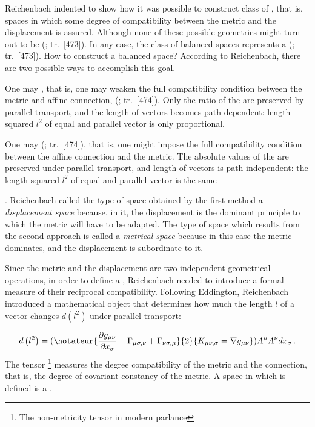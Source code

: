 \documentclass[submitted]{article}
\renewcommand{\rzlap}[2]{(\cite[#1]{Reichenbach1928}; tr.\ [#2])\xspace}
\begin{document}
Reichenbach indented to show how it was possible to construct class of , that is, spaces in which some degree of compatibility between the metric and the displacement is assured. Although none of these possible geometries might turn out to be  \rzlap{339}{473}. In any case, the class of balanced spaces represents a  \rzlap{339}{473}. How to construct a balanced space? According to Reichenbach, there are two possible ways to accomplish this goal. \begin{inparaenum}[(1)] \item One may , that is, one may weaken the full compatibility condition between the metric and affine connection,  \rzlap{339}{474}. Only the ratio of the \gmn are preserved by parallel transport, and the length of vectors becomes path-dependent: length-squared $l^2$ of equal and parallel vector is only proportional. \item One may  \rzlap{339}{474}, that is, one might impose the full compatibility condition between the affine connection and the metric. The absolute values of the \gmn are preserved under parallel transport, and length of vectors is path-independent: the length-squared $l^2$ of equal and parallel vector is the same \end{inparaenum}. Reichenbach called the type of space obtained by the first method a \emph{displacement space} because, in it, the displacement is the dominant principle to which the metric will have to be adapted. The type of space which results from the second approach is called a \emph{metrical space} because in this case the metric dominates, and the displacement is subordinate to it.

Since the metric and the displacement are two independent geometrical operations, in order to define a , Reichenbach needed to introduce a formal measure of their reciprocal compatibility. Following Eddington, Reichenbach introduced a mathematical object that determines how much the length $l$ of a vector changes $d\left(l^{2}\right)$ under parallel transport:

\begin{equation}\label{eq:nonmetricity}
{d}\left(l^{2}\right)=(\notateur{{\frac{\partial {g}_{\mu \nu}}{\partial {x}_{\sigma}}+\Gamma_{\mu \sigma, \nu}+\Gamma_{\nu \sigma, \mu}}}{2}{{K}_{\mu \nu, \sigma}=\nabla \gmn}) {A}^{\mu} {A}^{\nu} {d} {x}_{\sigma}\,.
\end{equation}
%
The tensor \nonmetr\footnote{The non-metricity tensor in modern parlance} measures the degree compatibility of the metric and the connection, that is, the degree of covariant constancy of the metric. A space in which \nonmetr is defined is a .
 
\end{document}
